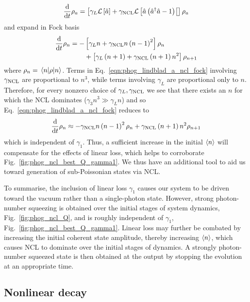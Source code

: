 \begin{equation}\label{eqn:phog_lindblad_a_ncl_2}
\frac{\mathrm{d}}{\mathrm{d}t} \rho_a = \left[ \gamma_L \mathcal{L}\left[\hat{a}\right] + \gamma_{\text{NCL}} \mathcal{L}\left[\hat{a}\left(\hat{a}^\dagger \hat{a} - 1\right)\right[\right] \rho_a
\end{equation}
and expand in Fock basis
\begin{align}\label{eqn:phog_lindblad_a_ncl_fock}
\ddt \rho_{n} = - &\left[ \gamma_L n + \gncl n \left(n - 1\right)^2 \right] \rho_n \notag \\
%
&+\left[ \gamma_L \left(n+1\right) + \gncl \left(n+1\right) n^2 \right] \rho_{n+1}
\end{align}
where $\rho_n = \ev{\rho}{n}$. Terms in Eq.~\ref{eqn:phog_lindblad_a_ncl_fock} involving $\gamma_{\text{NCL}}$ are proportional to $n^3$, while terms involving $\gamma_L$ are proportional only to $n$. Therefore, for every nonzero choice of $\gamma_L, \gamma_{\text{NCL}}$ we see that there exists an $n$ for which the NCL dominates ($\gamma_3 n^3 \gg \gamma_L n$) and so Eq.~\ref{eqn:phog_lindblad_a_ncl_fock} reduces to
\begin{equation}
\frac{\mathrm{d}}{\mathrm{d}t} \rho_n \approx - \gamma_{\text{NCL}} n \left(n-1\right)^2 \rho_n + \gamma_{\text{NCL}} \left(n+1\right)n^2 \rho_{n+1}
\end{equation}
which is independent of $\gamma_1$. Thus, a sufficient increase in the initial $\ev{n}$ will compensate for the effects of linear loss, which helps to corroborate Fig.~\ref{fig:phog_ncl_best_Q_gamma1}. We thus have an additional tool to aid us toward generation of sub-Poissonian states via NCL.

To summarise, the inclusion of linear loss $\gamma_1$ causes our system to be driven toward the vacuum rather than a single-photon state. However, strong photon-number squeezing is obtained over the initial stages of system dynamics, Fig.~\ref{fig:phog_ncl_Q}, and is roughly independent of $\gamma_1$, Fig.~\ref{fig:phog_ncl_best_Q_gamma1}. Linear loss may further be combated by increasing the initial coherent state amplitude, thereby increasing $\ev{n}$, which causes NCL to dominate over the initial stages of dynamics. A strongly photon-number squeezed state is then obtained at the output by stopping the evolution at an appropriate time.


\subsection{Nonlinear decay}

